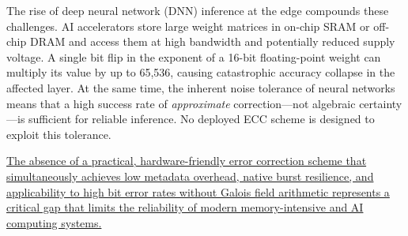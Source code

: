 The rise of deep neural network (DNN) inference at the edge compounds these challenges. AI accelerators store large weight matrices in on-chip SRAM or off-chip DRAM and access them at high bandwidth and potentially reduced supply voltage. A single bit flip in the exponent of a 16-bit floating-point weight can multiply its value by up to 65,536, causing catastrophic accuracy collapse in the affected layer. At the same time, the inherent noise tolerance of neural networks means that a high success rate of \emph{approximate} correction---not algebraic certainty---is sufficient for reliable inference. No deployed ECC scheme is designed to exploit this tolerance.

\noindent\underline{The absence of a practical, hardware-friendly error correction scheme that simultaneously achieves low metadata overhead, native burst resilience, and applicability to high bit error rates without Galois field arithmetic represents a critical gap that limits the reliability of modern memory-intensive and AI computing systems.}
